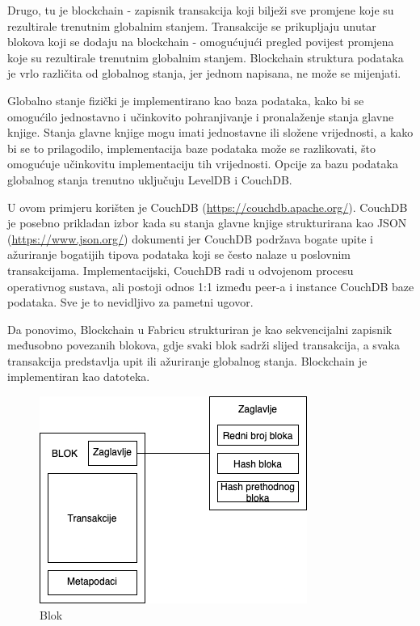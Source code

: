 \documentclass[times, utf8, diplomski]{fer}
\begin{document}
Drugo, tu je blockchain - zapisnik transakcija koji bilježi sve promjene koje su rezultirale trenutnim globalnim stanjem. Transakcije se prikupljaju unutar blokova koji se dodaju na blockchain - omogućujući pregled povijest promjena koje su rezultirale trenutnim globalnim stanjem. Blockchain struktura podataka je vrlo različita od globalnog stanja, jer jednom napisana, ne može se mijenjati.

Globalno stanje fizički je implementirano kao baza podataka, kako bi se omogućilo jednostavno i učinkovito pohranjivanje i pronalaženje stanja glavne knjige. Stanja glavne knjige mogu imati jednostavne ili složene vrijednosti, a kako bi se to prilagodilo, implementacija baze podataka može se razlikovati,  što omogućuje učinkovitu implementaciju tih vrijednosti. Opcije za bazu podataka globalnog stanja trenutno uključuju LevelDB i CouchDB.

U ovom primjeru korišten je CouchDB (\url{https://couchdb.apache.org/}).  CouchDB je posebno prikladan izbor kada su stanja glavne knjige strukturirana kao JSON (\url{https://www.json.org/}) dokumenti jer CouchDB podržava bogate upite i ažuriranje bogatijih tipova podataka koji se često nalaze u poslovnim transakcijama.  Implementacijski,  CouchDB radi u odvojenom procesu operativnog sustava, ali postoji odnos 1:1 između peer-a i instance CouchDB baze podataka. Sve je to nevidljivo za pametni ugovor.

Da ponovimo, Blockchain u Fabricu strukturiran je kao sekvencijalni zapisnik međusobno povezanih blokova, gdje svaki blok sadrži slijed transakcija, a svaka transakcija predstavlja upit ili ažuriranje globalnog stanja.  Blockchain je implementiran kao datoteka. 

\begin{figure}[htb]
\centering
\includegraphics[scale=0.5]{imgs/Block.png}
\caption{Blok}
\label{fig:blok}
\end{figure}
\end{document}
